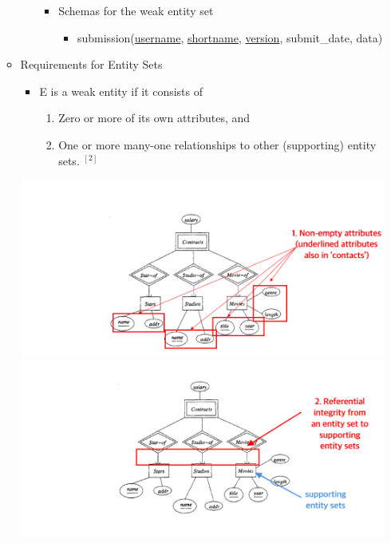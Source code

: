 \documentclass[12pt]{article}
\begin{document}
\begin{enumerate}[1.]
\begin{itemize}
\begin{itemize}
\begin{itemize}
                \item Schemas for the weak entity set

                \begin{itemize}
                    \item submission(\underline{username}, \underline{shortname}, \underline{version}, submit\_date, data)
                \end{itemize}
            \end{itemize}


        \end{itemize}

        \item Requirements for Entity Sets

        \begin{itemize}
            \item E is a weak entity if it consists of

            \begin{enumerate}[1.]
                \item Zero or more of its own attributes, and
                \item One or more many-one relationships to other (supporting) entity sets. $^{[2]}$
            \end{enumerate}

        \end{itemize}

        \begin{center}
        \includegraphics[width=\linewidth]{images/worksheet_14_solution_53.png}
        \includegraphics[width=\linewidth]{images/worksheet_14_solution_54.png}
        \end{center}


\end{itemize}
\end{enumerate}
\end{document}
